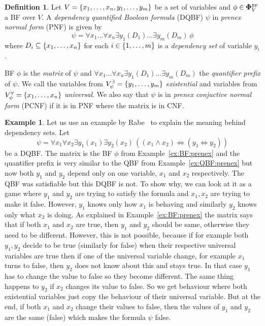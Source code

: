 \documentclass[
  digital, %
  color,
  twoside, %
  table,   %
  nolof,     %
  nolot,     %
]{fithesis3}
\let\setbuilder\set
\newcommand{\simpleset}[1]{\{{#1}\}}
\renewcommand{\set}[1]{\normalexpandarg\IfSubStr{#1}{|}{\setbuilder{#1}}{\simpleset{#1}}}
\theoremstyle{definition}
\newtheorem{definition}{Definition}
\newtheorem{example}{Example}
\theoremstyle{remark}
\newcommand{\BF}[1]{\mathbf{\Phi}_{#1}^{\normalfont{\text{\tiny BF}}}}
\newcommand{\evars}[1]{V_{#1}^{\exists}}
\newcommand{\uvars}[1]{V_{#1}^{\forall}}
\newcommand{\lequal}{\Leftrightarrow}
\newcommand{\itholds}{\,}
\begin{document}
\begin{definition}
  Let $V = \set{x_1, \dots, x_n, y_1, \dots, y_m}$ be a set of variables and $\phi \in \BF{V}$ a BF over $V$. A \emph{dependency quantified Boolean formula} (DQBF) $\psi$ in \emph{prenex normal form} (PNF) is given by
  \[\psi = \forall x_1 \dots \forall x_n \exists y_1 (D_1) \dots \exists y_m (D_m) \itholds \phi\]
  where $D_i \subseteq \set{x_1, \dots, x_n}$ for each $i \in \set{1,\dots,m}$ is a \emph{dependency set} of variable $y_i$.
  \label{def:DQBF:PNF}
\end{definition}
BF $\phi$ is the \emph{matrix} of $\psi$ and $\forall x_1 \dots \forall x_n \exists y_1 (D_1) \dots \exists y_m (D_m)$ the \emph{quantifier prefix} of $\psi$. We call the variables from $\evars{\psi} = \set{y_1,\dots,y_m}$ \emph{existential} and variables from $\uvars{\psi} = \set{x_1,\dots,x_n}$ \emph{universal}. We also say that $\psi$ is in \emph{prenex conjuctive normal form} (PCNF) if it is in PNF where the matrix is in CNF.



\begin{example}
Let us use an example by Rabe~\cite{DQBFProofSystem} to explain the meaning behind dependency sets. Let 
\[\psi = \forall x_1 \forall x_2 \exists y_1 (x_1) \exists y_2 (x_2) \itholds ((x_1 \land x_2) \lequal (y_1 \lequal y_2))\]
be a DQBF. The matrix is the BF $\phi$ from Example~\ref{ex:BF:prenex} and the quantifier prefix is very similar to the QBF from Example~\ref{ex:QBF:prenex} but now both $y_1$ and $y_2$ depend only on one variable, $x_1$ and $x_2$ respectively. The QBF was satisfiable but this DQBF is not. To show why, we can look at it as a game where $y_1$  and $y_2$ are trying to satisfy the formula and $x_1,x_2$ are trying to make it false. However, $y_1$ knows only how $x_1$ is behaving and similarly $y_2$ knows only what $x_2$ is doing. As explained in Example~\ref{ex:BF:prenex} the matrix says that if both $x_1$ and $x_2$ are true, then $y_1$ and $y_2$ should be same, otherwise they need to be different. However, this is not possible, because if for example both $y_1,y_2$ decide to be true (similarly for false) when their respective universal variables are true then if one of the universal variable change, for example $x_1$ turns to false, then $y_2$ does not know about this and stays true. In that case $y_1$ has to change the value to false so they become different. The same thing happens to $y_2$ if $x_2$ changes its value to false. So we get behaviour where both existential variables just copy the behaviour of their universal variable. But at the end, if both $x_1$ and $x_2$ change their values to false, then the values of $y_1$ and $y_2$ are the same (false) which makes the formula $\psi$ false.
\end{example}
\end{document}
